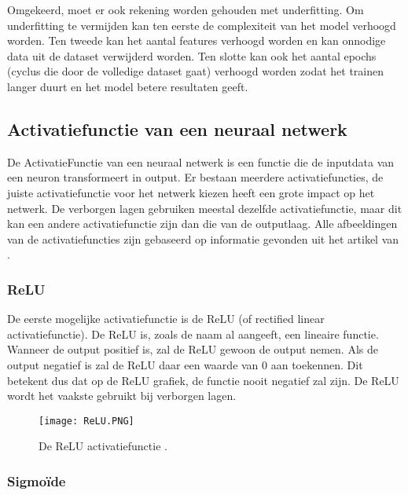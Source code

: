 Omgekeerd, moet er ook rekening worden gehouden met underfitting. Om underfitting te vermijden kan ten eerste de complexiteit van het model verhoogd worden. Ten tweede kan het aantal features verhoogd worden en kan onnodige data uit de dataset verwijderd worden. Ten slotte kan ook het aantal epochs (cyclus die door de volledige dataset gaat) verhoogd worden zodat het trainen langer duurt en het model betere resultaten geeft. \autocite{GeeksforGeeks2020}

\subsection{Activatiefunctie van een neuraal netwerk}
\label{sec:activatiefunctie}

De \gls{ActivatieFunctie} van een neuraal netwerk is een functie die de inputdata van een neuron transformeert in output. Er bestaan meerdere activatiefuncties, de juiste activatiefunctie voor het netwerk kiezen heeft een grote impact op het netwerk. De verborgen lagen gebruiken meestal dezelfde activatiefunctie, maar dit kan een andere activatiefunctie zijn dan die van de outputlaag. Alle afbeeldingen van de activatiefuncties zijn gebaseerd op informatie gevonden uit het artikel van \textcite{Brownlee2021}. 

\subsubsection{ReLU}
\label{sec:ReLU}

De eerste mogelijke activatiefunctie is de \gls{ReLU} (of rectified linear activatiefunctie). De ReLU is, zoals de naam al aangeeft, een lineaire functie. Wanneer de output positief is, zal de ReLU gewoon de output nemen. Als de output negatief is zal de ReLU daar een waarde van 0 aan toekennen. Dit betekent dus dat op de ReLU grafiek, de functie nooit negatief zal zijn. De ReLU wordt het vaakste gebruikt bij verborgen lagen. \autocite{Brownlee2021}

\begin{figure}[!htbp]
    \texttt{[image: ReLU.PNG]}
    \caption{\label{ReLU}De ReLU activatiefunctie \autocite{Brownlee2021}.}
\end{figure}
\FloatBarrier


\subsubsection{Sigmoïde}
\label{sec:sigmoide}

